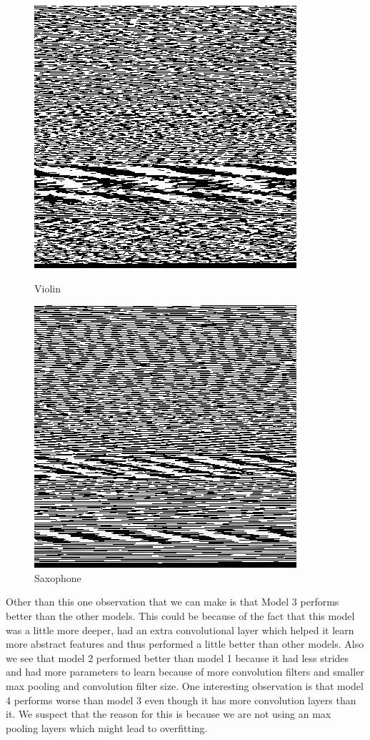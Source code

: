 \documentclass[letterpaper, 12 pt, conference]{ieeeconf}  %
\begin{document}
\begin{figure}[!htb]
   \begin{minipage}{0.24\textwidth}
     \centering
     \includegraphics[width=.7\linewidth]{../figs/similar_stacking/vio.jpg}
     \caption{Violin}\label{fig:Vio_sim_stacking}
   \end{minipage}\hfill
   \begin{minipage}{0.24\textwidth}
     \centering
     \includegraphics[width=.7\linewidth]{../figs/similar_stacking/sax.jpg}
     \caption{Saxophone}\label{fig:Sax_sim_stacking}
   \end{minipage}
\end{figure}


Other than this one observation that we can make is that Model 3 performs better than the other models. This could be because of the fact that this model was a little more deeper, had an extra convolutional layer which helped it learn more abstract features and thus performed a little better than other models. Also we see that model 2 performed better than model 1 because it had less strides and had more parameters to learn because of more convolution filters and smaller max pooling and convolution filter size. One interesting observation is that model 4 performs worse than model 3 even though it has more convolution layers than it. We suspect that the reason for this is because we are not using an max pooling layers which might lead to overfitting.
\end{document}
